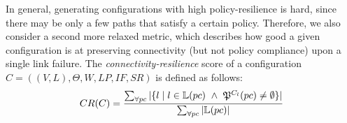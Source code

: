 In general, generating configurations with high policy-resilience is hard,
since there may be only a few paths that satisfy a certain policy.
Therefore, we also consider a second 
more relaxed metric, which describes how 
good a given configuration
is at preserving connectivity
(but not policy compliance) upon a single link failure. 
The \emph{connectivity-resilience} 
score of a configuration $C=((V,L), \Theta,W,LP,IF,SR)$
is defined as follows:
\[
CR(C)=\frac{\sum_{\forall pc} |\{ l \mid l \in \mathbb{L}(pc) ~\wedge~\mathfrak{P}^{C_l }(pc) \not= \emptyset  \}|}
{\sum_{\forall pc} |\mathbb{L}(pc)|}
\]
 


